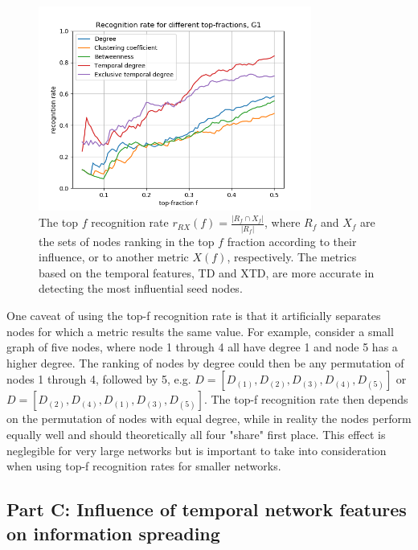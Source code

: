 \documentclass[letterpaper]{article}
\begin{document}
\begin{figure}[h!]
  \centering
   \includegraphics[width=0.8\textwidth]{img/rankG.png}
   \caption{\small{The top $f$ recognition rate $r_{RX}(f) = \frac{ |R_f \cap X_f| }{ |R_f| }$, where $R_f$ and $X_f$ are the sets of nodes ranking in the top $f$ fraction according to their influence,  or to another metric $X(f)$, respectively. The metrics based on the temporal features, TD and XTD, are more accurate in detecting the most influential seed nodes.}}
   \label{fig:rankG}
\end{figure}

\bigskip
\noindent One caveat of using the top-f recognition rate is that it artificially separates nodes for which a metric results the same value. For example, consider a small graph of five nodes, where node 1 through 4 all have degree 1 and node 5 has a higher degree. The ranking of nodes by degree could then be any permutation of nodes 1 through 4, followed by 5, e.g. \(D=[D_{(1)},D_{(2)},D_{(3)},D_{(4)},D_{(5)}]\) or \(D=[D_{(2)},D_{(4)},D_{(1)},D_{(3)},D_{(5)}]\). The top-f recognition rate then depends on the permutation of nodes with equal degree, while in reality the nodes perform equally well and should theoretically all four "share" first place. This effect is neglegible for very large networks but is important to take into consideration when using top-f recognition rates for smaller networks.

\pagebreak
\subsection*{Part C: Influence of temporal network features on information spreading}
\label{sec:partC}
\end{document}
